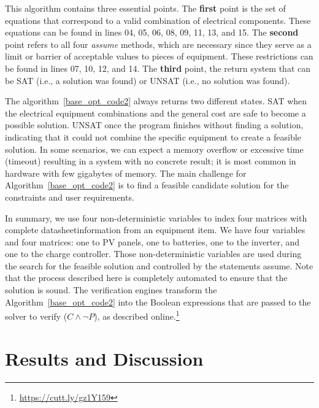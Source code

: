 \documentclass[journal]{IEEEtran}
\begin{document}
This algorithm contains three essential points. The \textbf{first} point is the set of equations that correspond to a valid combination of electrical components. These equations can be found in lines 04, 05, 06, 08, 09, 11, 13, and 15. The \textbf{second} point refers to all four \textit{assume} methods, which are necessary since they serve as a limit or barrier of acceptable values to pieces of equipment. These restrictions can be found in lines 07, 10, 12, and 14. The \textbf{third} point, the return system that can be SAT (i.e., a solution was found) or UNSAT (i.e., no solution was found).

The algorithm~\ref{base_opt_code2} always returns two different states. SAT when the electrical equipment combinations and the general cost are safe to become a possible solution.  UNSAT once the program finishes without finding a solution, indicating that it could not combine the specific equipment to create a feasible solution. In some scenarios, we can expect a memory overflow or excessive time (timeout) resulting in a system with no concrete result; it is most common in hardware with few gigabytes of memory. The main challenge for Algorithm~\ref{base_opt_code2} is to find a feasible candidate solution for the constraints and user requirements.

In summary, we use four non-deterministic variables to index four matrices with complete datasheet\footnotemark[\value{footnote}] information from an equipment item. We have four variables and four matrices: one to PV panels, one to batteries, one to the inverter, and one to the charge controller. Those non-deterministic variables are used during the search for the feasible solution and controlled by the statements assume. Note that the process described here is completely automated to ensure that the solution is sound. The verification engines transform the Algorithm~\ref{base_opt_code2} into the Boolean expressions that are passed to the solver to verify ($C \wedge \neg P$), as described online.\footnote{\href{https://cutt.ly/gz1Y159}{https://cutt.ly/gz1Y159}}

\section{Results and Discussion}

\end{document}
